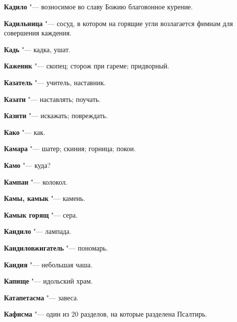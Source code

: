 \begin{mymulticols}{2}





\noindent\textbf{Кадило} "--- возносимое во славу Божию благовонное курение. 




\noindent\textbf{Кадильница} "--- сосуд, в котором на горящие угли возлагается фимиам для совершения каждения. 




\noindent\textbf{Кадь} "--- кадка, ушат. 




\noindent\textbf{Каженик} "--- скопец; сторож при гареме; придворный. 




\noindent\textbf{Казатель} "--- учитель, наставник. 




\noindent\textbf{Казати} "--- наставлять; поучать. 




\noindent\textbf{Казити} "--- искажать; повреждать. 




\noindent\textbf{Како} "--- как. 




\noindent\textbf{Камара} "--- шатер; скиния; горница; покои. 




\noindent\textbf{Камо} "--- куда? 




\noindent\textbf{Кампан} "--- колокол. 




\noindent\textbf{Камы, камык} "--- камень. 




\noindent\textbf{Камык горящ} "--- сера. 




\noindent\textbf{Кандило} "--- лампада. 




\noindent\textbf{Кандиловжигатель} "--- пономарь. 




\noindent\textbf{Кандия} "--- небольшая чаша. 




\noindent\textbf{Капище} "--- идольский храм. 




\noindent\textbf{Катапетасма} "--- завеса. 




\noindent\textbf{Кафисма} "--- один из 20 разделов, на которые разделена Псалтирь. 





\end{mymulticols}
